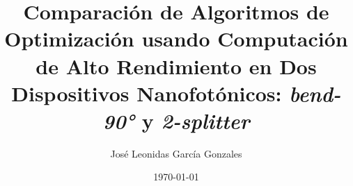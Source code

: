 \documentclass[a4paper, 12pt, oneside]{tesisutec}
\begin{document}
\frontmatter
{}

\title{Comparación de Algoritmos de Optimización usando Computación de Alto Rendimiento en Dos Dispositivos Nanofotónicos: \emph{bend-90°} y \emph{2-splitter}}
\author{José Leonidas García Gonzales}
\date{\today}

\maketitle
{}

%
%
%

\tableofcontents
\newpage
\listoftables
\newpage
\listoffigures


\mainmatter
\pagestyle{fancy}

%
%



%
%
%
%


\renewcommand{\bibname}{\large\bf{REFERENCIAS BIBLIOGRÁFICAS}}
\end{document}
